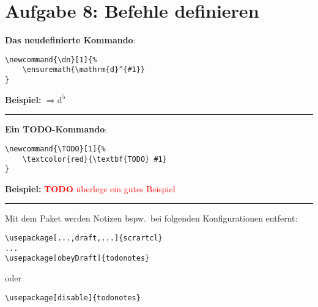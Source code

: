 \newcommand{\nextpart}{%
    \bigskip
    \noindent\rule{\textwidth}{1pt}
    \bigskip
}

\newcommand{\dn}[1]{%
    \ensuremath{\mathrm{d}^{#1}}
}

\newcommand{\TODO}[1]{%
    \textcolor{red}{\textbf{TODO} #1}
}

\newpage
\section{Aufgabe 8: Befehle definieren}
\textbf{Das neudefinierte Kommando}:
\begin{verbatim}
\newcommand{\dn}[1]{%
    \ensuremath{\mathrm{d}^{#1}}
}
\end{verbatim}

\textbf{Beispiel:}  $\Rightarrow \dn{5}$

\nextpart

\textbf{Ein TODO-Kommando}:
\begin{verbatim}
\newcommand{\TODO}[1]{%
    \textcolor{red}{\textbf{TODO} #1}
}
\end{verbatim}

\textbf{Beispiel:} \TODO{überlege ein gutes Beispiel}

\nextpart


Mit dem Paket  werden Notizen bspw.~bei folgenden
Konfigurationen entfernt:
\begin{verbatim}
\usepackage[...,draft,...]{scrartcl}
...
\usepackage[obeyDraft]{todonotes}
\end{verbatim}
oder
\begin{verbatim}
\usepackage[disable]{todonotes}
\end{verbatim}
